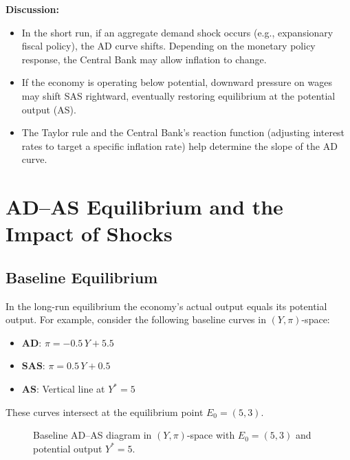 \bigskip

\noindent \textbf{Discussion:}
\begin{itemize}
    \item In the short run, if an aggregate demand shock occurs (e.g., expansionary fiscal policy), the AD curve shifts. Depending on the monetary policy response, the Central Bank may allow inflation to change.
    \item If the economy is operating below potential, downward pressure on wages may shift SAS rightward, eventually restoring equilibrium at the potential output (AS).
    \item The Taylor rule and the Central Bank's reaction function (adjusting interest rates to target a specific inflation rate) help determine the slope of the AD curve.
\end{itemize}

\section*{AD--AS Equilibrium and the Impact of Shocks}
\subsection*{Baseline Equilibrium}
In the long-run equilibrium the economy's actual output equals its potential output. For example, consider the following baseline curves in \((Y,\pi)\)-space:
\begin{itemize}
    \item \(\textbf{AD:}\) \(\pi = -0.5\,Y + 5.5\)
    \item \(\textbf{SAS:}\) \(\pi = 0.5\,Y + 0.5\)
    \item \(\textbf{AS:}\) Vertical line at \(Y^*=5\)
\end{itemize}
These curves intersect at the equilibrium point \(E_0=(5,3)\).
\begin{figure}[ht]
    \centering
    \caption{Baseline AD--AS diagram in \((Y,\pi)\)-space with \(E_0=(5,3)\) and potential output \(Y^*=5\).}
\end{figure}

